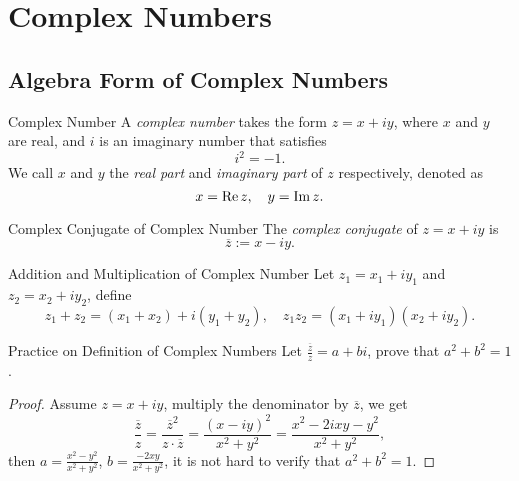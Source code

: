 

\section{Complex Numbers}

\subsection{Algebra Form of Complex Numbers}

\begin{definition}{Complex Number}{}
  A \emph{complex number} takes the form $z = x + iy$, where $x$ and $y$ are real,
  and $i$ is an imaginary number that satisfies
  \begin{equation}
    i^2 = -1.
  \end{equation}
  We call $x$ and $y$ the \emph{real part} and \emph{imaginary part} of $z$
  respectively, denoted as
  \begin{equation}
    x = \operatorname{Re}{z}, \quad y = \operatorname{Im}{z}.
  \end{equation}
\end{definition}

\begin{definition}{Complex Conjugate of Complex Number}{}
  The \emph{complex conjugate} of $z = x + iy$ is
  \begin{equation}
    \overline{z} := x - iy.
  \end{equation}
\end{definition}

\begin{definition}{Addition and Multiplication of Complex Number}{}
  Let $z_1 = x_1 + iy_1$ and $z_2 = x_2 + iy_2$, define
  \begin{equation}
    z_1 + z_2 = (x_1 + x_2) + i(y_1 + y_2), \quad
    z_1 z_2 = (x_1 + iy_1)(x_2 + iy_2).
  \end{equation}
\end{definition}

\begin{example}{Practice on Definition of Complex Numbers}{}
  Let $\frac{\overline{z}}{z} = a + bi$, prove that $a^2 + b^2 = 1$.
\end{example}

\begin{proof}
  Assume $z = x + iy$,
  multiply the denominator by $\overline{z}$, we get
  \begin{equation}
    \frac{\overline{z}}{z} = \frac{\overline{z}^2}{z \cdot \overline{z}}
    = \frac{(x-iy)^2}{x^2 + y^2} = \frac{x^2 - 2ixy - y^2}{x^2 + y^2},
  \end{equation}
  then $a = \frac{x^2 - y^2}{x^2 + y^2}$, $b = \frac{-2xy}{x^2 + y^2}$,
  it is not hard to verify that $a^2 + b^2 = 1$.
\end{proof}

